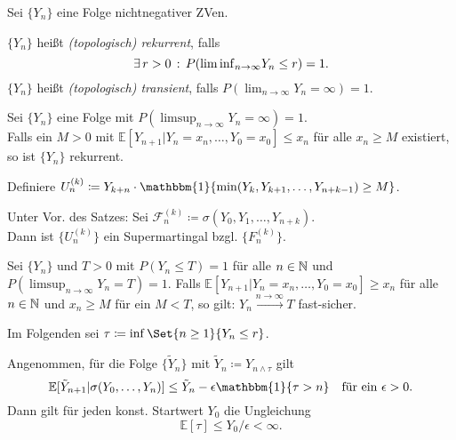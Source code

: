 \documentclass{cheat-sheet}
\newcommand{\E}{\mathbb{E}} %
\newcommand{\ind}{\mathbbm{1}} %
\newcommand{\Filt}{\mathcal{F}} %
\begin{document}

Sei $\{ Y_n \}$ eine Folge nichtnegativer ZVen.

\begin{defn}
  $\{ Y_n \}$ heißt \emph{(topologisch) rekurrent}, falls
  \[ \exists \, {r > 0} \,:\, P({\liminf}_{n \to \infty} Y_n \leq r) = 1. \]
  $\{ Y_n \}$ heißt \emph{(topologisch) transient}, falls $P({\lim}_{n \to \infty} Y_n = \infty) = 1$.
\end{defn}

\begin{satz}
  Sei $\{ Y_n \}$ eine Folge mit $P({\limsup}_{n \to \infty} Y_n = \infty) = 1$. \\
  Falls ein $M > 0$ mit $\E[ Y_{n+1} | Y_n = x_n, \ldots, Y_0 = x_0 ] \leq x_n$ für alle $x_n \geq M$ existiert, so ist $\{ Y_n \}$ rekurrent.
\end{satz}

Definiere $U_n^{(k)} \coloneqq Y_{k+n} \cdot \ind \{ \min(Y_k, Y_{k+1}, \ldots, Y_{n+k-1}) \geq M \}$.

\begin{lem}
  \begin{minipage}[t]{0.8 \linewidth}
    Unter Vor. des Satzes:
    Sei $\Filt_n^{(k)} \coloneqq \sigma(Y_0, Y_1, \ldots, Y_{n+k})$. \\
    Dann ist $\{ U_n^{(k)} \}$ ein Supermartingal bzgl. $\{ F_n^{(k)} \}$.
  \end{minipage}
\end{lem}

\begin{satz}
  Sei $\{ Y_n \}$ und $T > 0$ mit $P(Y_n \leq T) = 1$ für alle $n \in \mathbb{N}$ und $P({\limsup}_{n \to \infty} Y_n = T) = 1$.
  Falls $\E[ Y_{n+1} | Y_n = x_n, \ldots, Y_0 = x_0 ] \geq x_n$ für alle $n \in \mathbb{N}$ und $x_n \geq M$ für ein $M < T$, so gilt:
  $Y_n \xrightarrow{n \to \infty} T$ fast-sicher.
\end{satz}

Im Folgenden sei $\tau \coloneqq \inf \Set{n \geq 1}{Y_n \leq r}$.

\begin{satz}
  Angenommen, für die Folge $\{ \tilde{Y}_n \}$ mit $\tilde{Y}_n \coloneqq Y_{n \wedge \tau}$ gilt
  \[
    \E[ \tilde{Y}_{n+1} | \sigma(Y_0, \ldots, Y_n) ] \leq \tilde{Y}_n - \epsilon \ind \{ \tau > n \}
    \quad \text{für ein $\epsilon > 0$}.
  \]
  Dann gilt für jeden konst. Startwert $Y_0$ die Ungleichung
  \[ \E[\tau] \leq Y_0 / \epsilon < \infty. \]
\end{satz}
\end{document}
